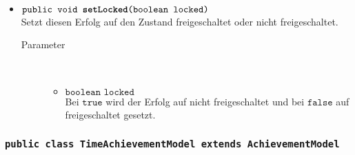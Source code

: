 \begin{description}
\begin{itemize}
	\item $\texttt{public void \textbf{setLocked}(boolean locked)}$ \\ Setzt diesen Erfolg auf den Zustand freigeschaltet oder nicht freigeschaltet.
		\begin{description}
			\item[Parameter] \hfill \\
			\vspace{-.8cm}
			\begin{itemize}
				\item $\texttt{boolean locked}$ \\ Bei $\texttt{true}$ wird der Erfolg auf nicht freigeschaltet und bei $\texttt{false}$ auf freigeschaltet gesetzt.
			\end{itemize}
		\end{description}

	\end{itemize}
\end{description}

\subsubsection{\normalfont \texttt{public class \textbf{TimeAchievementModel} extends AchievementModel}}



